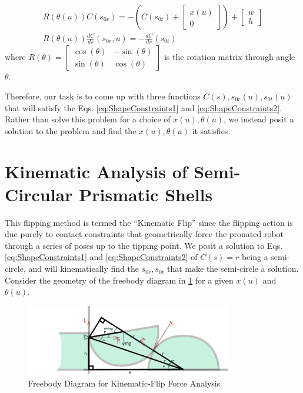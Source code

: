 \documentclass[letterpaper]{report}
\begin{document}
\begin{align}
  R(\theta(u) ) C(s_{0r}) = - \left(C(s_{0t})+\begin{bmatrix}x(u) \\ 0\end{bmatrix} \right) +\begin{bmatrix}w \\ h\end{bmatrix} \label{eq:ShapeConstraints1} \\
  R(\theta(u) ) \frac{d C}{d s}(s_{0r},u) = - \frac{d C}{d s}(s_{0t})
  \label{eq:ShapeConstraints2}
\end{align}
where $R(\theta) = \begin{bmatrix} \cos(\theta) & -\sin(\theta) \\ \sin(\theta) & \cos(\theta) \end{bmatrix}$ is the rotation matrix through angle $\theta$.

Therefore, our task is to come up with three functions $C(s), s_{0r}(u), s_{0t}(u)$ that will satisfy the Eqs. \ref{eq:ShapeConstraints1} and \ref{eq:ShapeConstraints2}.
Rather than solve this problem for a choice of $x(u), \theta(u)$, we instead posit a solution to the problem and find the $x(u),\theta(u)$ it satisfies.

\section{Kinematic Analysis of Semi-Circular Prismatic Shells}
This flipping method is termed the ``Kinematic Flip'' since the flipping action is due purely to contact constraints that geometrically force the pronated robot through a series of poses up to the tipping point.
We posit a solution to Eqs. \ref{eq:ShapeConstraints1} and \ref{eq:ShapeConstraints2} of $C(s) = r$ being a semi-circle, and will kinematically find the $s_{0r}, s_{0t}$ that make the semi-circle a solution.
Consider the geometry of the freebody diagram in \ref{fig:KinFreebody} for a given $x(u)$ and $\theta(u)$.

\begin{figure}[ht]
\centering
\includegraphics[width=0.8\textwidth]{Kin_FreeBodyDiagram.png}
\caption{\label{fig:KinFreebody}Freebody Diagram for Kinematic-Flip Force Analysis}
\end{figure}
\end{document}
